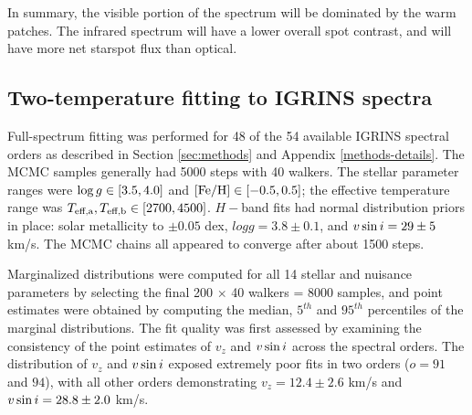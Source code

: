 \documentclass[twocolumn]{emulateapj}%
\begin{document}
In summary, the visible portion of the spectrum will be dominated by the warm patches.  The infrared spectrum will have a lower overall spot contrast, and will have more net starspot flux than optical.


\subsection{Two-temperature fitting to IGRINS spectra}\label{sec:two_tempIGRINS}

Full-spectrum fitting was performed for 48 of the 54 available IGRINS spectral orders as described in Section \ref{sec:methods} and Appendix \ref{methods-details}.  The MCMC samples generally had 5000 steps with 40 walkers.  The stellar parameter ranges were $\log g \in [3.5, 4.0]$ and $[{\rm Fe}/{\rm H}] \in [-0.5, 0.5]$; the effective temperature range was $T_\textrm{eff,a}, T_\textrm{eff,b} \in [2700, 4500]$.  $H-$band fits had normal distribution priors in place: solar metallicity to $\pm0.05$ dex, $logg=3.8\pm0.1$, and $v \sin i=29\pm5$ km/s.  The MCMC chains all appeared to converge after about 1500 steps.

Marginalized distributions were computed for all 14 stellar and nuisance parameters by selecting the final 200 $\times$ 40 walkers = 8000 samples, and point estimates were obtained by computing the median, $5^{th}$ and $95^{th}$ percentiles of the marginal distributions.  The fit quality was first assessed by examining the consistency of the point estimates of $v_z$ and $v \sin i$ across the spectral orders.  The distribution of $v_z$ and $v \sin i$ exposed extremely poor fits in two orders ($o=91$ and $94$), with all other orders demonstrating $v_z = 12.4 \pm 2.6$ km/s and $v \sin i = 28.8 \pm 2.0$ km/s.  
\end{document}
